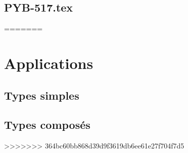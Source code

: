 \renewcommand{\xxexo}{PYB-517.tex} 
\subsection*{\xxexo} 
\graphicspath{{../../exos/python_bases/PYB-517/}}
 
=======
\section{Applications}
\subsection{Types simples}
\setcounter{thequestion}{0}

\subsection{Types composés}
\setcounter{thequestion}{0}

>>>>>>> 364bc60bb868d39d9f3619db6ee61e27f704f7d5
